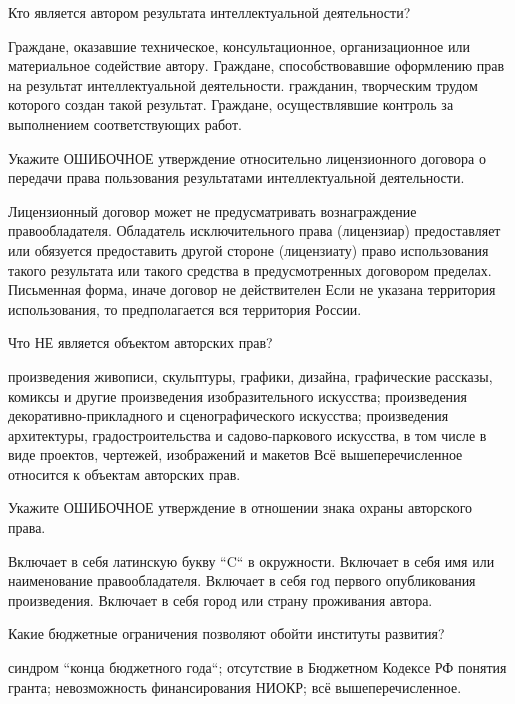 \documentclass[12pt, table]{exam}
\begin{document}
\begin{questions}
\begin{multicols}{2}
\question Кто является автором результата интеллектуальной деятельности?
\begin{choices}
	\choice Граждане, оказавшие техническое, консультационное, организационное или материальное содействие автору.
	\choice Граждане, способствовавшие оформлению прав на результат интеллектуальной деятельности.
	\CC гражданин, творческим трудом которого создан
	такой результат. 
	\choice Граждане, осуществлявшие контроль за выполнением соответствующих работ.
\end{choices}
\question Укажите ОШИБОЧНОЕ утверждение относительно лицензионного договора о передачи права пользования результатами интеллектуальной деятельности.
\begin{choices}
	\CC Лицензионный договор может не предусматривать вознаграждение правообладателя.
	\choice Обладатель исключительного права (лицензиар) предоставляет или обязуется предоставить другой стороне (лицензиату) право использования такого результата или такого средства в предусмотренных договором пределах.
	\choice Письменная форма, иначе договор не 	действителен
	\choice Если не указана территория использования, то предполагается вся территория России.
\end{choices}
\question Что НЕ является объектом авторских прав?
\begin{choices}
	\choice произведения живописи, скульптуры, графики, дизайна, графические рассказы, комиксы и другие произведения изобразительного искусства;
	\choice произведения декоративно-прикладного и сценографического искусства;
	\choice произведения архитектуры, градостроительства и садово-паркового
	искусства, в том числе в виде проектов, чертежей, изображений и макетов
	\CC Всё вышеперечисленное относится к объектам авторских прав.
\end{choices}
\question Укажите ОШИБОЧНОЕ утверждение в отношении знака охраны авторского права.
\begin{choices}
	\choice Включает в себя латинскую букву ``C`` в окружности.
	\choice Включает в себя имя или наименование правообладателя.
	\choice Включает в себя год первого опубликования произведения.
	\CC Включает в себя город или страну проживания автора. 
\end{choices}
\question Какие бюджетные ограничения позволяют обойти институты развития?
\begin{choices}
	\choice синдром “конца бюджетного года“;
	\choice отсутствие в Бюджетном Кодексе РФ понятия гранта;
	\choice невозможность финансирования НИОКР;
	\CC всё вышеперечисленное.
\end{choices}

\end{multicols}
\end{questions}
\end{document}
